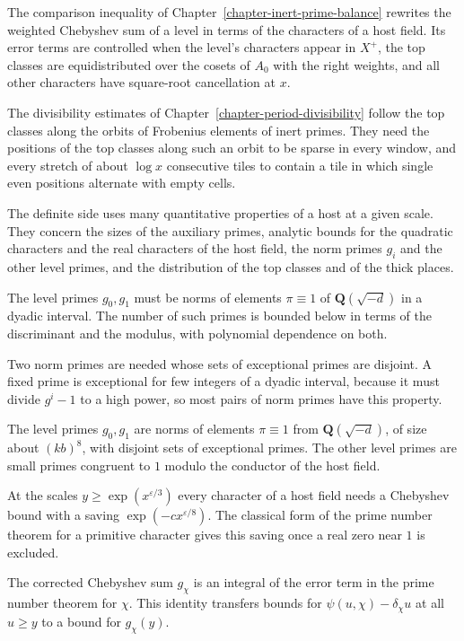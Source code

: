 The comparison inequality of Chapter~\ref{chapter-inert-prime-balance} rewrites the weighted
Chebyshev sum of a level in terms of the characters of a host field. Its error terms are controlled
when the level's characters appear in $X^+$, the top classes are equidistributed over the cosets of
$A_0$ with the right weights, and all other characters have square-root cancellation at $x$.

The divisibility estimates of Chapter~\ref{chapter-period-divisibility} follow the top classes along
the orbits of Frobenius elements of inert primes. They need the positions of the top classes along
such an orbit to be sparse in every window, and every stretch of about $\log x$ consecutive tiles to
contain a tile in which single even positions alternate with empty cells.

The definite side uses many quantitative properties of a host at a given scale. They concern the
sizes of the auxiliary primes, analytic bounds for the quadratic characters and the real characters
of the host field, the norm primes $g_i$ and the other level primes, and the distribution of the top
classes and of the thick places.

The level primes $g_0,g_1$ must be norms of elements $\pi\equiv1$ of $\mathbf Q(\sqrt{-d})$ in a
dyadic interval. The number of such primes is bounded below in terms of the discriminant and the
modulus, with polynomial dependence on both.

Two norm primes are needed whose sets of exceptional primes are disjoint. A fixed prime is
exceptional for few integers of a dyadic interval, because it must divide $g^i-1$ to a high power, so
most pairs of norm primes have this property.

The level primes $g_0,g_1$ are norms of elements $\pi\equiv1$ from $\mathbf Q(\sqrt{-d})$, of size
about $(kb)^8$, with disjoint sets of exceptional primes. The other level primes are small primes
congruent to $1$ modulo the conductor of the host field.

At the scales $y\geq\exp(x^{\varepsilon/3})$ every character of a host field needs a Chebyshev
bound with a saving $\exp(-cx^{\varepsilon/8})$. The classical form of the prime number theorem for
a primitive character gives this saving once a real zero near $1$ is excluded.

The corrected Chebyshev sum $g_\chi$ is an integral of the error term in the prime number theorem
for $\chi$. This identity transfers bounds for $\psi(u,\chi)-\delta_\chi u$ at all $u\geq y$ to a
bound for $g_\chi(y)$.


